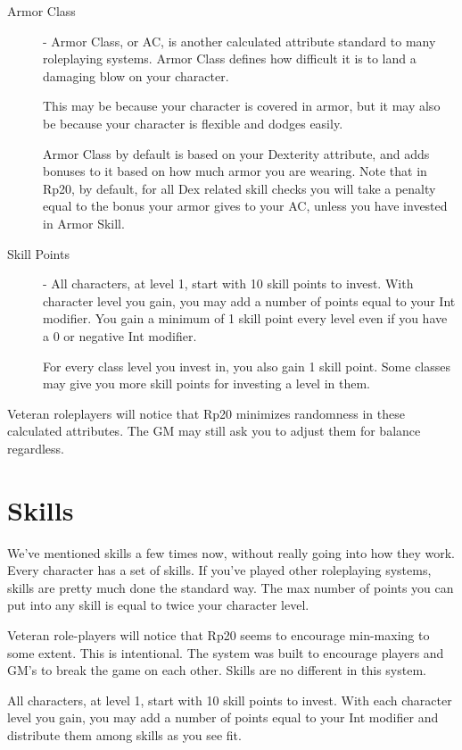 \begin{description}
	\item[Armor Class] - Armor Class, or AC, is another calculated attribute standard to many roleplaying systems. Armor Class defines how difficult it is to land a damaging blow on your character.
	
	This may be because your character is covered in armor, but it may also be because your character is flexible and dodges easily.
	
	Armor Class by default is based on your Dexterity attribute, and adds bonuses to it based on how much armor you are wearing. Note that in Rp20, by default, for all Dex related skill checks you will take a penalty equal to the bonus your armor gives to your AC, unless you have invested in Armor Skill.
	
	\item[Skill Points] - All characters, at level 1, start with 10 skill points to invest. With character level you gain, you may add a number of points equal to your Int modifier. You gain a minimum of 1 skill point every level even if you have a 0 or negative Int modifier.
	
	For every class level you invest in, you also gain 1 skill point. Some classes may give you more skill points for investing a level in them.
\end{description}

Veteran roleplayers will notice that Rp20 minimizes randomness in these calculated attributes. The GM may still ask you to adjust them for balance regardless.

\section{Skills}
We've mentioned skills a few times now, without really going into how they work. Every character has a set of skills. If you’ve played other roleplaying systems, skills are pretty much done the standard way. The max number of points you can put into any skill is equal to twice your character level.

Veteran role-players will notice that Rp20 seems to encourage min-maxing to some extent. This is intentional. The system was built to encourage players and GM’s to break the game on each other. Skills are no different in this system.

All characters, at level 1, start with 10 skill points to invest. With each character level you gain, you may add a number of points equal to your Int modifier and distribute them among skills as you see fit.

